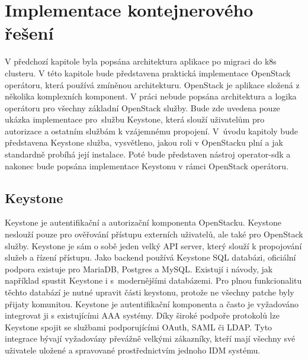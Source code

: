 \chapter{Implementace kontejnerového řešení}
V předchozí kapitole byla popsána architektura aplikace po migraci do k8s clusteru. V této kapitole bude představena praktická implementace OpenStack operátoru, která používá zmíněnou architekturu. OpenStack je aplikace složená z několika komplexních komponent. V práci nebude popsána architektura a logika operátoru pro všechny základní OpenStack služby. Bude zde uvedena pouze ukázka implementace pro službu Keystone, která slouží uživatelům pro autorizace a ostatním službám k vzájemnému propojení. V úvodu kapitoly bude představena Keystone služba, vysvětleno, jakou roli v OpenStacku plní a jak standardně probíhá její instalace. Poté bude představen nástroj operator-sdk a nakonec bude popsána implementace Keystonu v rámci OpenStack operátoru.

\section{Keystone}
Keystone je autentifikační a autorizační komponenta OpenStacku. Keystone neslouží pouze pro ověřování přístupu externích uživatelů, ale také pro OpenStack služby. Keystone je sám o sobě jeden velký API server, který slouží k propojování služeb a řízení přístupu. Jako backend používá Keystone SQL databázi, oficiální podpora existuje pro MariaDB, Postgres a MySQL. Existují i návody, jak například spustit Keystone i s modernějšími databázemi. Pro plnou funkcionalitu těchto databází je nutné upravit části keystonu, protože ne všechny patche byly přijaty komunitou. Keystone je autentifikační komponenta a často je vyžadováno integrovat ji s existujícími AAA systémy. Díky široké podpoře protokolů lze Keystone spojit se službami podporujícími OAuth, SAML či LDAP. Tyto integrace bývají vyžadovány převážně velkými zákazníky, kteří mají všechny své uživatele uložené a spravované prostřednictvím jednoho IDM systému.

